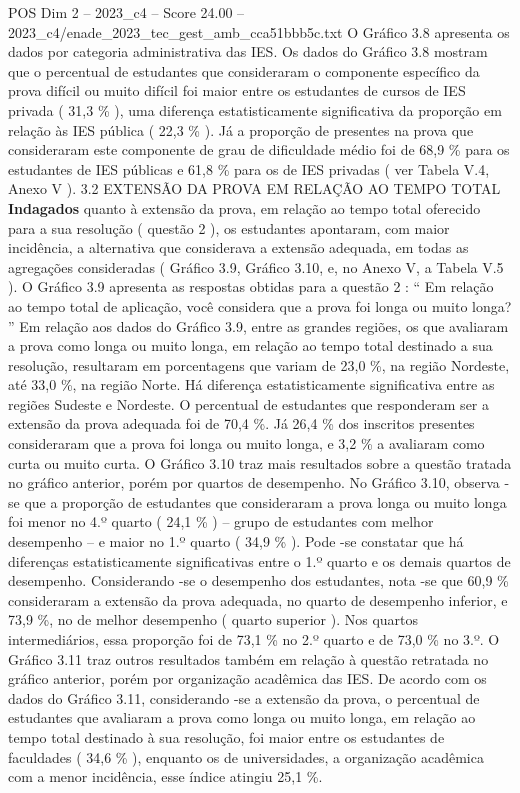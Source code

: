 \begin{textsample}{POS Dim 2 – 2023\_c4 – Score 24.00 – 2023\_c4/enade\_2023\_tec\_gest\_amb\_cca51bbb5c.txt}
O Gráfico 3.8 apresenta os dados por categoria administrativa das IES.
Os dados do Gráfico 3.8 mostram que o percentual de estudantes que consideraram o componente específico da prova difícil ou muito difícil foi maior entre os estudantes de cursos de IES privada ( 31,3 \% ), uma diferença estatisticamente significativa da proporção em relação às IES pública ( 22,3 \% ).
Já a proporção de presentes na prova que consideraram este componente de grau de dificuldade médio foi de 68,9 \% para os estudantes de IES públicas e 61,8 \% para os de IES privadas ( ver Tabela V.4, Anexo V ). 3.2 EXTENSÃO DA PROVA EM RELAÇÃO AO TEMPO TOTAL \textbf{Indagados} quanto à extensão da prova, em relação ao tempo total oferecido para a sua resolução ( questão 2 ), os estudantes apontaram, com maior incidência, a alternativa que considerava a extensão adequada, em todas as agregações consideradas ( Gráfico 3.9, Gráfico 3.10, e, no Anexo V, a Tabela V.5 ).
O Gráfico 3.9 apresenta as respostas obtidas para a questão 2 : “ Em relação ao tempo total de aplicação, você considera que a prova foi longa ou muito longa? ” Em relação aos dados do Gráfico 3.9, entre as grandes regiões, os que avaliaram a prova como longa ou muito longa, em relação ao tempo total destinado a sua resolução, resultaram em porcentagens que variam de 23,0 \%, na região Nordeste, até 33,0 \%, na região Norte.
Há diferença estatisticamente significativa entre as regiões Sudeste e Nordeste.
O percentual de estudantes que responderam ser a extensão da prova adequada foi de 70,4 \%.
Já 26,4 \% dos inscritos presentes consideraram que a prova foi longa ou muito longa, e 3,2 \% a avaliaram como curta ou muito curta.
O Gráfico 3.10 traz mais resultados sobre a questão tratada no gráfico anterior, porém por quartos de desempenho.
No Gráfico 3.10, observa -se que a proporção de estudantes que consideraram a prova longa ou muito longa foi menor no 4.º quarto ( 24,1 \% ) – grupo de estudantes com melhor desempenho – e maior no 1.º quarto ( 34,9 \% ).
Pode -se constatar que há diferenças estatisticamente significativas entre o 1.º quarto e os demais quartos de desempenho.
Considerando -se o desempenho dos estudantes, nota -se que 60,9 \% consideraram a extensão da prova adequada, no quarto de desempenho inferior, e 73,9 \%, no de melhor desempenho ( quarto superior ).
Nos quartos intermediários, essa proporção foi de 73,1 \% no 2.º quarto e de 73,0 \% no 3.º.
O Gráfico 3.11 traz outros resultados também em relação à questão retratada no gráfico anterior, porém por organização acadêmica das IES.
De acordo com os dados do Gráfico 3.11, considerando -se a extensão da prova, o percentual de estudantes que avaliaram a prova como longa ou muito longa, em relação ao tempo total destinado à sua resolução, foi maior entre os estudantes de faculdades ( 34,6 \% ), enquanto os de universidades, a organização acadêmica com a menor incidência, esse índice atingiu 25,1 \%.

\end{textsample}
